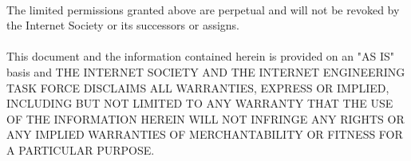        \paragraph{}
The limited permissions granted above are perpetual and will not be
revoked by the Internet Society or its successors or assigns.
        \paragraph{}
This document and the information contained herein is provided on an
"AS IS" basis and THE INTERNET SOCIETY AND THE INTERNET ENGINEERING
TASK FORCE DISCLAIMS ALL WARRANTIES, EXPRESS OR IMPLIED, INCLUDING
BUT NOT LIMITED TO ANY WARRANTY THAT THE USE OF THE INFORMATION
HEREIN WILL NOT INFRINGE ANY RIGHTS OR ANY IMPLIED WARRANTIES OF
MERCHANTABILITY OR FITNESS FOR A PARTICULAR PURPOSE.
